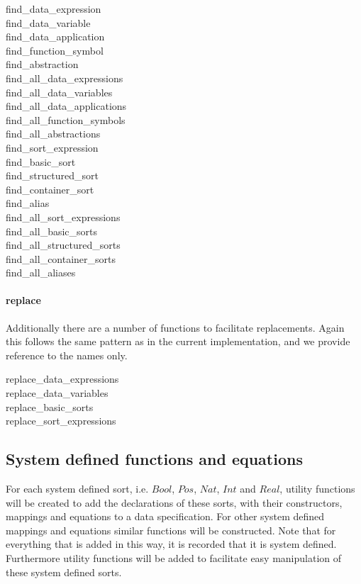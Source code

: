 \documentclass[a4paper,11pt]{article}
\begin{document}
\begin{description}
  \item[find\_data\_expression]
  \item[find\_data\_variable]
  \item[find\_data\_application]
  \item[find\_function\_symbol]
  \item[find\_abstraction]
  \item[find\_all\_data\_expressions]
  \item[find\_all\_data\_variables]
  \item[find\_all\_data\_applications]
  \item[find\_all\_function\_symbols]
  \item[find\_all\_abstractions]
  \item[find\_sort\_expression]
  \item[find\_basic\_sort]
  \item[find\_structured\_sort]
  \item[find\_container\_sort]
  \item[find\_alias]
  \item[find\_all\_sort\_expressions]
  \item[find\_all\_basic\_sorts]
  \item[find\_all\_structured\_sorts]
  \item[find\_all\_container\_sorts]
  \item[find\_all\_aliases]
\end{description}

\paragraph{replace}
Additionally there are a number of functions to facilitate replacements. Again this follows the same pattern as in the current implementation, and we provide reference to the names only.

\begin{description}
  \item[replace\_data\_expressions]
  \item[replace\_data\_variables]
  \item[replace\_basic\_sorts]
  \item[replace\_sort\_expressions]
\end{description}

\subsection{System defined functions and equations}
For each system defined sort, i.e. $Bool$, $Pos$, $Nat$, $Int$ and $Real$, utility functions will be created to add the declarations of these sorts, with their constructors, mappings and equations to a data specification. For other system defined mappings and equations similar functions will be constructed. Note that for everything that is added in this way, it is recorded that it is system defined. Furthermore utility functions will be added to facilitate easy manipulation of these system defined sorts.
\end{document}
